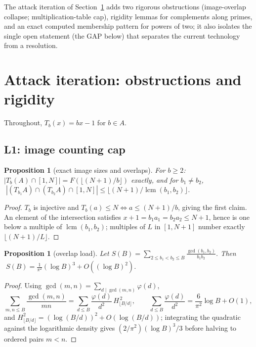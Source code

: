 \documentclass[11pt]{article}
\newtheorem{proposition}[theorem]{Proposition}
\theoremstyle{definition}
\newcommand{\A}{A}
\newcommand{\F}{F}
\begin{document}
The attack iteration of Section~\ref{sec:attack} adds two rigorous
obstructions (image-overlap collapse; multiplication-table cap), rigidity
lemmas for complements along primes, and an exact computed membership pattern
for powers of two; it also isolates the single open statement (the GAP below)
that separates the current technology from a resolution.

\section{Attack iteration: obstructions and rigidity}\label{sec:attack}

Throughout, $T_b(x)=bx-1$ for $b\in\A$.

\subsection{L1: image counting cap}

\begin{proposition}[exact image sizes and overlaps]\label{prop:L1}
For $b\ge2$: $|T_b(\A)\cap[1,N]|=\F(\lfloor (N+1)/b\rfloor)$ exactly, and for
$b_1\ne b_2$,
$\;|(T_{b_1}\A)\cap(T_{b_2}\A)\cap[1,N]|\le\lfloor (N+1)/\operatorname{lcm}(b_1,b_2)\rfloor$.
\end{proposition}

\begin{proof}
$T_b$ is injective and $T_b(a)\le N \iff a\le(N+1)/b$, giving the first claim.
An element of the intersection satisfies $x+1=b_1a_1=b_2a_2\le N+1$, hence is
one below a multiple of $\operatorname{lcm}(b_1,b_2)$; multiples of $L$ in
$[1,N+1]$ number exactly $\lfloor(N+1)/L\rfloor$.
\end{proof}

\begin{proposition}[overlap load]\label{prop:overlap}
Let $\displaystyle S(B)=\sum_{2\le b_1<b_2\le B}\frac{\gcd(b_1,b_2)}{b_1b_2}$.
Then $\;S(B)=\frac{1}{\pi^2}(\log B)^3+O((\log B)^2)$.
\end{proposition}

\begin{proof}
Using $\gcd(m,n)=\sum_{d\mid\gcd(m,n)}\varphi(d)$,
\[
\sum_{m,n\le B}\frac{\gcd(m,n)}{mn}
=\sum_{d\le B}\frac{\varphi(d)}{d^2}\,H_{\lfloor B/d\rfloor}^{\,2},
\qquad
\sum_{d\le B}\frac{\varphi(d)}{d^2}=\frac{6}{\pi^2}\log B+O(1),
\]
and $H_{\lfloor B/d\rfloor}^2=(\log(B/d))^2+O(\log(B/d))$; integrating the
quadratic against the logarithmic density gives $(2/\pi^2)(\log B)^3/3$
before halving to ordered pairs $m<n$.
\end{proof}
\end{document}
